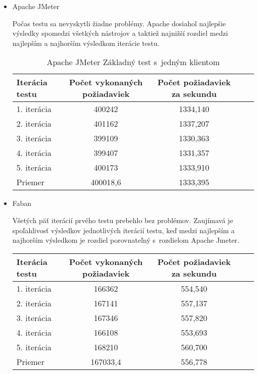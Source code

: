 \documentclass[12pt,oneside,final]{fithesis-utf8}
\begin{document}
\begin{itemize}

\item Apache JMeter

Počas testu sa nevyskytli žiadne problémy. Apache dosiahol najlepšie výsledky spomedzi všetkých nástrojov a taktiež najnižší rozdiel medzi najlepším a najhorším výsledkom iterácie testu.

\begin{table}[H]
\begin{center}
\begin{tabular}{ | l | c | c | c | c |}
		\hline
		 \textbf{Iterácia testu} & \textbf{Počet vykonaných požiadaviek} & \textbf{Počet požiadaviek za sekundu} \\ \hline
		 1. iterácia & 400242 & 1334,140 \\ \hline
		 2. iterácia & 401162 & 1337,207 \\ \hline
		 3. iterácia & 399109 & 1330,363 \\ \hline
		 4. iterácia & 399407 & 1331,357 \\ \hline
		 5. iterácia & 400173 & 1333,910 \\ \hline
		 Priemer & 400018,6 & 1333,395 \\ \hline
		 
\end{tabular}
\end{center}
\caption{Apache JMeter Základný test s~jedným klientom}
\end{table}

\item Faban

Všetých päť iterácií prvého testu prebehlo bez problémov. Zaujímavá je spoľahlivosť výsledkov jednotlivých iterácií testu, keď medzi najlepším a najhorším výsledkom je rozdiel porovnateľný s~rozdielom Apache Jmeter.

\begin{table}[H]
\begin{center}
\begin{tabular}{ | l | c | c | c | c |}
		\hline
		 \textbf{Iterácia testu} & \textbf{Počet vykonaných požiadaviek} & \textbf{Počet požiadaviek za sekundu} \\ \hline
		 1. iterácia & 166362 & 554,540 \\ \hline
		 2. iterácia & 167141 & 557,137 \\ \hline
		 3. iterácia & 167346 & 557,820 \\ \hline
		 4. iterácia & 166108 & 553,693 \\ \hline
		 5. iterácia & 168210 & 560,700 \\ \hline
		 Priemer & 167033,4 & 556,778 \\ \hline
		 

\end{tabular}
\end{center}
\end{table}
\end{itemize}
\end{document}
